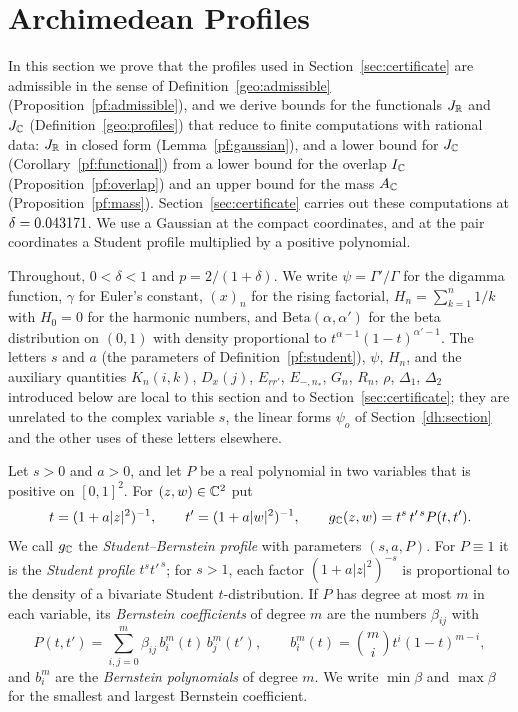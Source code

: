 \section{Archimedean Profiles}
\label{pf:section}

In this section we prove that the profiles used in
Section~\ref{sec:certificate} are admissible in the sense of
Definition~\ref{geo:admissible} (Proposition~\ref{pf:admissible}), and we
derive bounds for the functionals $J_\mathbb R$ and $J_\mathbb C$
(Definition~\ref{geo:profiles}) that reduce to finite computations with
rational data: $J_\mathbb R$ in closed form (Lemma~\ref{pf:gaussian}), and a lower
bound for $J_\mathbb C$ (Corollary~\ref{pf:functional}) from a lower bound for the
overlap $I_\mathbb C$ (Proposition~\ref{pf:overlap}) and an upper bound for the mass
$A_\mathbb C$ (Proposition~\ref{pf:mass}). Section~\ref{sec:certificate} carries out
these computations at $\delta=0.043171$. We use a Gaussian at the compact
coordinates, and at the pair coordinates a Student profile multiplied by a
positive polynomial.

Throughout, $0<\delta<1$ and $p=2/(1+\delta)$. We write $\psi=\Gamma'/\Gamma$
for the digamma function, $\gamma$ for Euler's constant, $(x)_n$ for the
rising factorial, $H_n=\sum_{k=1}^n1/k$ with $H_0=0$ for the harmonic numbers,
and $\mathrm{Beta}(\alpha,\alpha')$ for the beta distribution on $(0,1)$ with
density proportional to $t^{\alpha-1}(1-t)^{\alpha'-1}$. The letters $s$ and
$a$ (the parameters of Definition~\ref{pf:student}), $\psi$, $H_n$, and the
auxiliary quantities $K_n(i,k)$, $D_x(j)$, $E_{rr'}$, $E_{-,n_*}$, $G_n$,
$R_n$, $\rho$, $\Delta_1$, $\Delta_2$ introduced below are local to this
section and to Section~\ref{sec:certificate}; they are unrelated to the
complex variable $s$, the linear forms $\psi_o$ of Section~\ref{dh:section}
and the other uses of these letters elsewhere.

\begin{definition}\label{pf:student}
Let $s>0$ and $a>0$, and let $P$ be a real polynomial in two variables
that is positive on $[0,1]^2$. For $(z,w)\in\mathbb C^2$ put
\[
 t=(1+a|z|^2)^{-1},\qquad t'=(1+a|w|^2)^{-1},\qquad
 g_\mathbb C(z,w)=t^s\,t'^{\,s}P(t,t').
\]
We call $g_\mathbb C$ the \emph{Student--Bernstein profile} with parameters
$(s,a,P)$. For $P\equiv1$ it is the \emph{Student profile}
$t^st'^{\,s}$; for $s>1$, each factor $(1+a|z|^2)^{-s}$ is proportional
to the density of a bivariate Student $t$-distribution. If $P$ has
degree at most $m$ in each variable, its \emph{Bernstein coefficients}
of degree $m$ are the numbers $\beta_{ij}$ with
\[
 P(t,t')=\sum_{i,j=0}^m\beta_{ij}\,b_i^m(t)\,b_j^m(t'),\qquad
 b_i^m(t)=\binom mi t^i(1-t)^{m-i},
\]
and $b_i^m$ are the \emph{Bernstein polynomials} of degree $m$. We write
$\min\beta$ and $\max\beta$ for the smallest and largest Bernstein
coefficient.
\end{definition}

